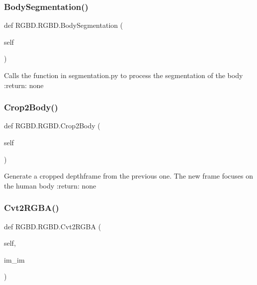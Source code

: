 \subsubsection{\texorpdfstring{Body\+Segmentation()}{BodySegmentation()}}
{\footnotesize\ttfamily def R\+G\+B\+D.\+R\+G\+B\+D.\+Body\+Segmentation (\begin{DoxyParamCaption}\item[{}]{self }\end{DoxyParamCaption})}

\begin{DoxyVerb}Calls the function in segmentation.py to process the segmentation of the body
:return:  none
\end{DoxyVerb}
 \mbox{\label{class_r_g_b_d_1_1_r_g_b_d_a9581af6ebd3185db5b84b0851c7b431e}} 
\subsubsection{\texorpdfstring{Crop2\+Body()}{Crop2Body()}}
{\footnotesize\ttfamily def R\+G\+B\+D.\+R\+G\+B\+D.\+Crop2\+Body (\begin{DoxyParamCaption}\item[{}]{self }\end{DoxyParamCaption})}

\begin{DoxyVerb}Generate a cropped depthframe from the previous one. The new frame focuses on the human body
:return: none
\end{DoxyVerb}
 \mbox{\label{class_r_g_b_d_1_1_r_g_b_d_a5e84e29e01792dc088319af0130e201c}} 
\subsubsection{\texorpdfstring{Cvt2\+R\+G\+B\+A()}{Cvt2RGBA()}}
{\footnotesize\ttfamily def R\+G\+B\+D.\+R\+G\+B\+D.\+Cvt2\+R\+G\+BA (\begin{DoxyParamCaption}\item[{}]{self,  }\item[{}]{im\+\_\+im }\end{DoxyParamCaption})}

